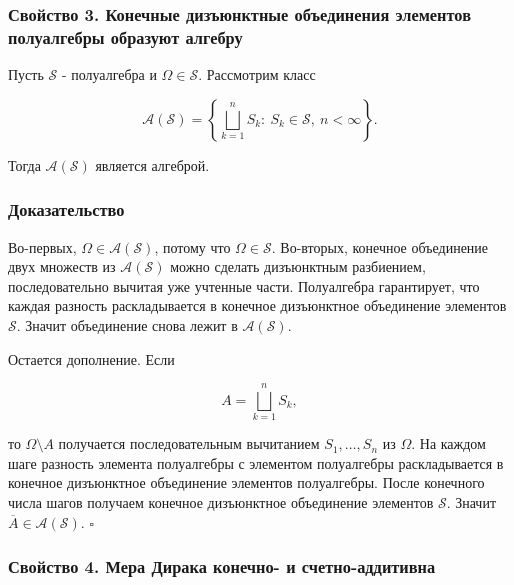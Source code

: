 \documentclass[
  11pt,
  a4paper,
]{article}
\begin{document}
\subsubsection{Свойство 3. Конечные дизъюнктные объединения элементов
полуалгебры образуют
алгебру}\label{ux441ux432ux43eux439ux441ux442ux432ux43e-3.-ux43aux43eux43dux435ux447ux43dux44bux435-ux434ux438ux437ux44aux44eux43dux43aux442ux43dux44bux435-ux43eux431ux44aux435ux434ux438ux43dux435ux43dux438ux44f-ux44dux43bux435ux43cux435ux43dux442ux43eux432-ux43fux43eux43bux443ux430ux43bux433ux435ux431ux440ux44b-ux43eux431ux440ux430ux437ux443ux44eux442-ux430ux43bux433ux435ux431ux440ux443}

Пусть \(\mathcal S\) - полуалгебра и \(\Omega\in\mathcal S\). Рассмотрим
класс

\[
\mathcal A(\mathcal S)=\left\{\bigsqcup_{k=1}^n S_k:\ S_k\in\mathcal S,\ n<\infty\right\}.
\]

Тогда \(\mathcal A(\mathcal S)\) является алгеброй.

\subsubsection{Доказательство}\label{ux434ux43eux43aux430ux437ux430ux442ux435ux43bux44cux441ux442ux432ux43e-2}

Во-первых, \(\Omega\in\mathcal A(\mathcal S)\), потому что
\(\Omega\in\mathcal S\). Во-вторых, конечное объединение двух множеств
из \(\mathcal A(\mathcal S)\) можно сделать дизъюнктным разбиением,
последовательно вычитая уже учтенные части. Полуалгебра гарантирует, что
каждая разность раскладывается в конечное дизъюнктное объединение
элементов \(\mathcal S\). Значит объединение снова лежит в
\(\mathcal A(\mathcal S)\).

Остается дополнение. Если

\[
A=\bigsqcup_{k=1}^n S_k,
\]

то \(\Omega\setminus A\) получается последовательным вычитанием
\(S_1,\ldots,S_n\) из \(\Omega\). На каждом шаге разность элемента
полуалгебры с элементом полуалгебры раскладывается в конечное
дизъюнктное объединение элементов полуалгебры. После конечного числа
шагов получаем конечное дизъюнктное объединение элементов
\(\mathcal S\). Значит \(\overline{A}\in\mathcal A(\mathcal S)\).
\(\square\)

\subsubsection{Свойство 4. Мера Дирака конечно- и
счетно-аддитивна}\label{ux441ux432ux43eux439ux441ux442ux432ux43e-4.-ux43cux435ux440ux430-ux434ux438ux440ux430ux43aux430-ux43aux43eux43dux435ux447ux43dux43e--ux438-ux441ux447ux435ux442ux43dux43e-ux430ux434ux434ux438ux442ux438ux432ux43dux430}
\end{document}
